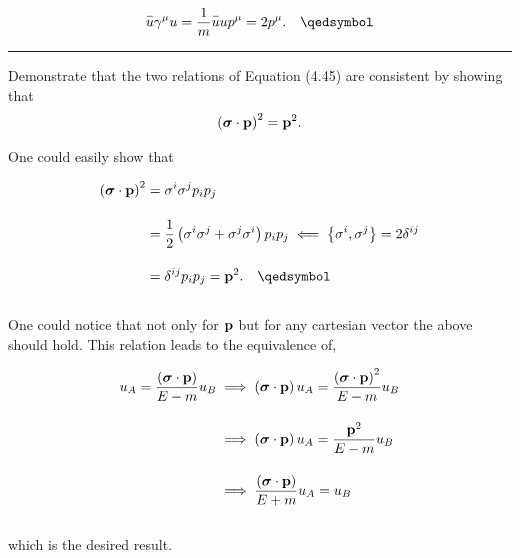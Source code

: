\begin{solution}
\begin{align*}
    \overbar{u}\gamma^\mu u  = \frac{1}{m}\overbar{u} u p^\mu = 2p^\mu. \qed
\end{align*}
\end{solution}

\noindent\rule{7in}{1.5pt}


\begin{problem}{4.10}
Demonstrate that the two relations of Equation (4.45) are consistent by showing that
\begin{align*}
    \left( \boldsymbol{\sigma} \cdot \mathbf{p} \right)^2 = \mathbf{p}^2.
\end{align*}
\end{problem}
\begin{solution}
One could easily show that

\begin{align*}
    \left(\boldsymbol{\sigma}\cdot \boldp \right)^2 &= \sigma^i\sigma^j p_i p_j \\[0.15in]
                                                    &= \frac{1}{2} \left( \sigma^i\sigma^j  +  \sigma^j\sigma^i \right) p_i p_j \impliedby \left\{ \sigma^i, \sigma^j\right\} = 2\delta^{ij} \\[0.15in]
                                                    &= \delta^{ij} p_i p_j = \boldp^2. \qed
\end{align*}\\
One could notice that not only for $\mathbf{p}$ but for any cartesian vector the above should hold. This relation leads to the equivalence of, 

\begin{align*}
    u_A = \frac{\left(\boldsymbol{\sigma}\cdot \mathbf{p}\right)}{E-m} u_B &\implies \left(\boldsymbol{\sigma}\cdot \mathbf{p}\right) u_A = \frac{\left(\boldsymbol{\sigma}\cdot \mathbf{p}\right)^2}{E-m} u_B \\[0.15in]
                                                                       &\implies \left(\boldsymbol{\sigma}\cdot \mathbf{p}\right) u_A = \frac{ \mathbf{p}^2}{E-m} u_B \\[0.15in]
                                                                       &\implies \frac{\left(\boldsymbol{\sigma}\cdot \mathbf{p}\right)}{E+m} u_A = u_B 
\end{align*}\\
which is the desired result.
\end{solution}

